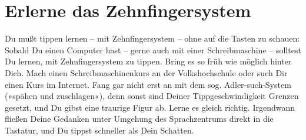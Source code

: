 
\chapter{Erlerne das Zehnfingersystem}

Du mußt tippen lernen – mit Zehnfingersystem – ohne auf die Tasten zu schauen: Sobald Du einen Computer hast – gerne auch mit einer Schreibmaschine – solltest Du lernen, mit Zehnfingersystem zu tippen. Bring es so früh wie möglich hinter Dich.  Mach einen Schreibmaschinenkurs an der Volkshochschule oder such Dir einen Kurs im Internet. Fang gar nicht erst an mit dem sog. Adler-such-System (»spähen und zuschlagen«), denn sonst sind Deiner Tippgeschwindigkeit Grenzen gesetzt, und Du gibst eine traurige Figur ab. Lerne es gleich richtig. Irgendwann fließen Deine Gedanken unter Umgehung des Sprachzentrums direkt in die Tastatur, und Du tippst schneller als Dein Schatten.